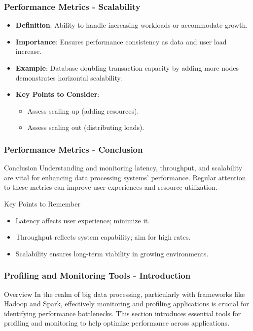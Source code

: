 \documentclass[aspectratio=169]{beamer}
\begin{document}
\begin{frame}[fragile]
    \frametitle{Performance Metrics - Scalability}
    \begin{itemize}
        \item \textbf{Definition}: Ability to handle increasing workloads or accommodate growth.
        \item \textbf{Importance}: Ensures performance consistency as data and user load increase.
        \item \textbf{Example}: Database doubling transaction capacity by adding more nodes demonstrates horizontal scalability.
        \item \textbf{Key Points to Consider}:
        \begin{itemize}
            \item Assess scaling up (adding resources).
            \item Assess scaling out (distributing loads).
        \end{itemize}
    \end{itemize}
\end{frame}

\begin{frame}[fragile]
    \frametitle{Performance Metrics - Conclusion}
    \begin{block}{Conclusion}
        Understanding and monitoring latency, throughput, and scalability are vital for enhancing data processing systems' performance. 
        Regular attention to these metrics can improve user experiences and resource utilization.
    \end{block}
    \begin{block}{Key Points to Remember}
        \begin{itemize}
            \item Latency affects user experience; minimize it.
            \item Throughput reflects system capability; aim for high rates.
            \item Scalability ensures long-term viability in growing environments.
        \end{itemize}
    \end{block}
\end{frame}

\begin{frame}[fragile]
    \frametitle{Profiling and Monitoring Tools - Introduction}
    \begin{block}{Overview}
        In the realm of big data processing, particularly with frameworks like Hadoop and Spark, effectively monitoring and profiling applications is crucial for identifying performance bottlenecks. This section introduces essential tools for profiling and monitoring to help optimize performance across applications.
    \end{block}
\end{frame}
\end{document}
